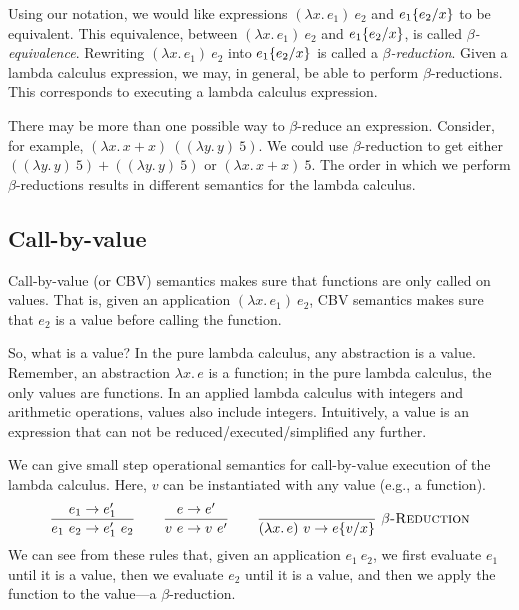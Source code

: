 Using our notation, we would like expressions $(\lambda x.\,e_1)\ e_2$ and $e_1\{e_2/x\}$ to be
equivalent. This equivalence, between $(\lambda x.\,e_1)\ e_2$ and $e_1\{e_2/x\}$, is called
\emph{$\beta$-equivalence}. Rewriting $(\lambda x.\,e_1)\ e_2$ into $e_1\{e_2/x\}$ is called a
\emph{$\beta$-reduction}. Given a lambda calculus expression, we may, in general, be able to
perform $\beta$-reductions. This corresponds to executing a lambda calculus expression.

There may be more than one possible way to $\beta$-reduce an expression. Consider, for example,
$(\lambda x.\,x+x)\ ((\lambda y.\,y)\ 5)$. We could use $\beta$-reduction to get either
$((\lambda y.\,y)\ 5)+((\lambda y.\,y)\ 5)$ or $(\lambda x.\,x+x)\ 5$. The order in which we
perform $\beta$-reductions results in different semantics for the lambda calculus.

\subsection{Call-by-value}

Call-by-value (or CBV) semantics makes sure that functions are only called on values. That is,
given an application $(\lambda x.\,e_1)\ e_2$, CBV semantics makes sure that $e_2$ is a value
before calling the function.

So, what is a value? In the pure lambda calculus, any abstraction is a value. Remember, an
abstraction $\lambda x.\,e$ is a function; in the pure lambda calculus, the only values are
functions. In an applied lambda calculus with integers and arithmetic operations, values also
include integers. Intuitively, a value is an expression that can not be
reduced/executed/simplified any further.

We can give small step operational semantics for call-by-value execution of the lambda calculus.
Here, $v$ can be instantiated with any value (e.g., a function).
\[
  \rul{e_1\to e_1'}{e_1\ e_2\to e_1'\ e_2}
  \qquad
  \rul{e\to e'}{v\ e\to v\ e'}
  \qquad
  \infr{}{(\lambda x.\,e)\ v\to\sub{e}{v}{x}}{$\beta$-Reduction}
\]
We can see from these rules that, given an application $e_1\ e_2$, we first evaluate $e_1$ until it
is a value, then we evaluate $e_2$ until it is a value, and then we apply the function to the
value---a $\beta$-reduction.

